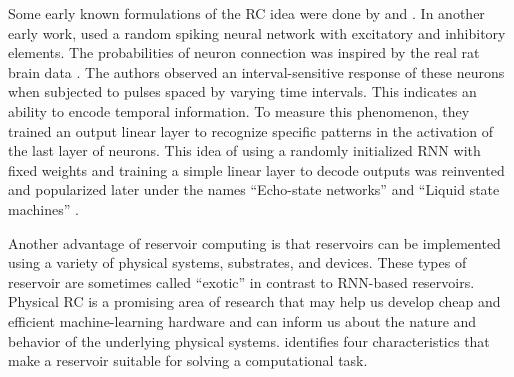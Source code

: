 Some early known formulations of the \ac{RC} idea were done by
\textcite{kirbyContextDynamicsNeural1991} and
\textcite{schomakerNeuralNetworkModels1990,
  schomakerSimulationRecognitionHandwriting1991,
  schomakerNeuralOscillatornetworkModel1992}. In another early work,
\textcite{buonomanoTemporalInformationTransformed1995} used a random spiking
neural network with excitatory and inhibitory elements. The probabilities of neuron 
connection was inspired by the real rat brain data
\parencite{masonSynapticTransmissionIndividual1991}. The authors observed an interval-sensitive response of these neurons when subjected to pulses spaced by varying
time intervals. This indicates an ability to encode temporal information. To
measure this phenomenon, they trained an output linear layer to recognize specific
patterns in the activation of the last layer of neurons. This idea of using a
randomly initialized \ac{RNN} with fixed weights and training a simple linear layer
to decode outputs was reinvented and popularized later under the names
``Echo-state networks'' \parencite{jaegerEchoStateApproach2001} and ``Liquid
state machines'' \parencite{maassRealTimeComputingStable2002}.

Another advantage of reservoir computing is that reservoirs can be
implemented using a variety of physical systems, substrates, and devices. These
types of reservoir are sometimes called ``exotic''
\parencite{lukoseviciusReservoirComputingApproaches2009} in contrast to
\ac{RNN}-based reservoirs. Physical \ac{RC} is a promising area of research
that may help us develop cheap and efficient machine-learning hardware and can
inform us about the nature and behavior of the underlying physical systems.
\textcite{tanakaRecentAdvancesPhysical2019} identifies four characteristics that
make a reservoir suitable for solving a computational task.

